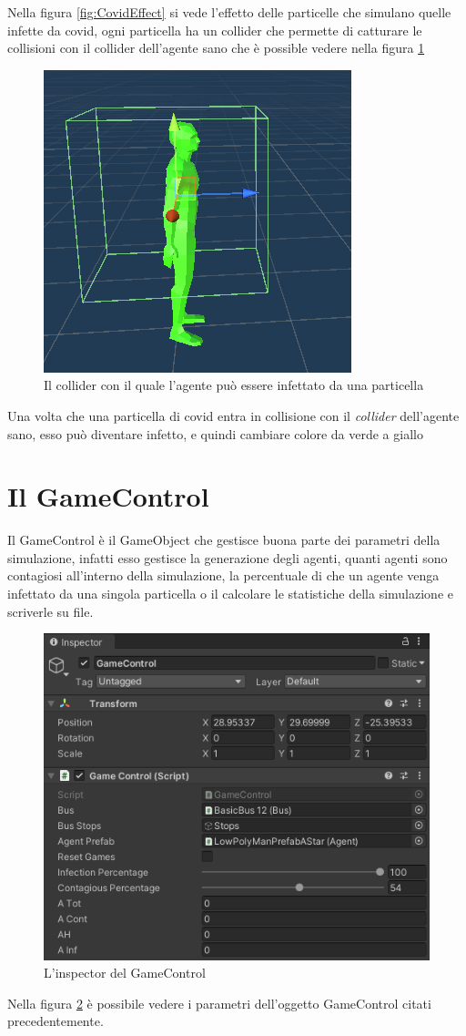 \documentclass[12pt, openany]{book}
\begin{document}
 	Nella figura \ref{fig:CovidEffect} si vede l'effetto delle particelle che simulano quelle infette da covid, ogni particella ha un collider che permette di catturare le collisioni con il collider dell'agente sano che è possible vedere nella figura \ref{fig:ColliderCovid}
 	\begin{figure}[H]
 		\centering
 		\includegraphics[width=0.5\linewidth]{"Immagini/ColliderCovid.png"}
 		\caption{Il collider con il quale l'agente può essere infettato da una particella}
 		\label{fig:ColliderCovid}
 	\end{figure}
 	Una volta che una particella di covid entra in collisione con il \emph{collider} dell'agente sano, esso può diventare infetto, e quindi cambiare colore da verde a giallo
 	\section{Il GameControl}
 		Il GameControl è il GameObject che gestisce buona parte dei parametri della simulazione,  infatti esso gestisce la generazione degli agenti, quanti agenti sono contagiosi all'interno della simulazione, la percentuale di che un agente venga infettato da una singola particella o il calcolare le statistiche della simulazione e scriverle su file.
 		\begin{figure}[H]
 			\centering
 			\includegraphics[width=1\linewidth]{"Immagini/GameControl.png"}
 			\caption{L'inspector del GameControl}
 			\label{fig:GameControl}
 		\end{figure}
 		Nella figura \ref{fig:GameControl} è possibile vedere i parametri dell'oggetto GameControl citati precedentemente.
\end{document}
